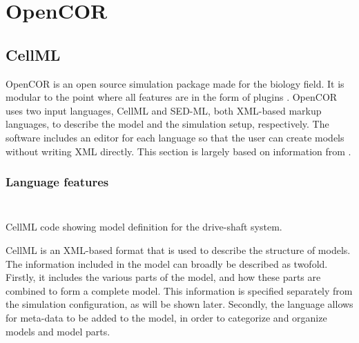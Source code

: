 \documentclass[\rootfolder/main.tex]{subfiles}
\begin{document}
\chapter{OpenCOR} %

\label{ch:opencor} %

\section{CellML}

OpenCOR is an open source simulation package made for the biology field.
It is modular to the point where all features are in the form of plugins \cite{10.3389/fphys.2015.00026}.
OpenCOR uses two input languages, CellML and SED-ML, both XML-based markup languages, to describe the model and the simulation setup, respectively.
The software includes an editor for each language so that the user can create models without writing XML directly.
This section is largely based on information from \cite{cuellar2003}.

\subsection{Language features}

\begin{wraptable}{R}{0.5\columnwidth}
    \inputminted[lastline=27]{cellml}{\rootfolder/Models/OpenCOR/Inertial.input}
\end{wraptable}

\begin{listing}[ht]
    \inputminted[firstline=28]{cellml}{\rootfolder/Models/OpenCOR/Inertial.input}
    \caption{CellML code showing model definition for the drive-shaft system.\label{lst:cellml-inertial-model}}
\end{listing}

CellML is an XML-based format that is used to describe the structure of models.
The information included in the model can broadly be described as twofold.
Firstly, it includes the various parts of the model, and how these parts are combined to form a complete model.
This information is specified separately from the simulation configuration, as will be shown later.
Secondly, the language allows for meta-data to be added to the model, in order to categorize and organize models and model parts.
\end{document}
